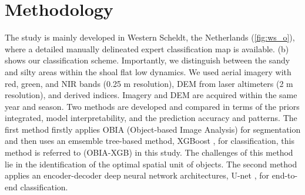 \documentclass{isprs} %
\begin{document}
\section{Methodology}\label{method}
 
The study is mainly developed in Western Scheldt, the Netherlands (\cref{fig:ws_o}), where a detailed manually delineated expert classification map is available. 
 (b) shows our classification scheme. Importantly, we distinguish between the sandy and silty areas within the shoal flat low dynamics. We used aerial imagery with red, green, and NIR bands (0.25 m resolution), DEM from laser altimeters (2 m resolution), and derived indices. Imagery and DEM are acquired within the same year and season. Two methods are developed and compared in terms of the priors integrated, model interpretability, and the prediction accuracy and patterns. The first method firstly applies OBIA (Object-based Image Analysis) for segmentation and then uses an emsemble tree-based method, XGBoost \citep{Chen:2016:XST:2939672.2939785}, for classification, this method is referred to (OBIA-XGB) in this study. The challenges of this method lie in the identification of the optimal spatial unit of objects. The second method applies an encoder-decoder deep neural network architectures, U-net \citep{ronneberger2015u}, for end-to-end classification. 




\end{document}
